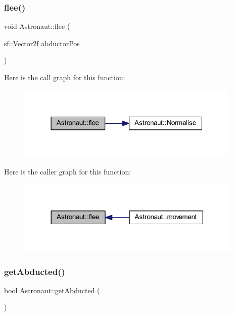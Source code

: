 \mbox{\label{class_astronaut_a81199297e80402f219a58a2fff56372c}} 
\subsubsection{\texorpdfstring{flee()}{flee()}}
{\footnotesize\ttfamily void Astronaut\+::flee (\begin{DoxyParamCaption}\item[{sf\+::\+Vector2f}]{abductor\+Pos }\end{DoxyParamCaption})}

Here is the call graph for this function\+:
\nopagebreak
\begin{figure}[H]
\begin{center}
\leavevmode
\includegraphics[width=304pt]{class_astronaut_a81199297e80402f219a58a2fff56372c_cgraph}
\end{center}
\end{figure}
Here is the caller graph for this function\+:
\nopagebreak
\begin{figure}[H]
\begin{center}
\leavevmode
\includegraphics[width=305pt]{class_astronaut_a81199297e80402f219a58a2fff56372c_icgraph}
\end{center}
\end{figure}
\mbox{\label{class_astronaut_a531b1ad1af11a0c788a182fa7b71794f}} 
\subsubsection{\texorpdfstring{get\+Abducted()}{getAbducted()}}
{\footnotesize\ttfamily bool Astronaut\+::get\+Abducted (\begin{DoxyParamCaption}{ }\end{DoxyParamCaption})}

